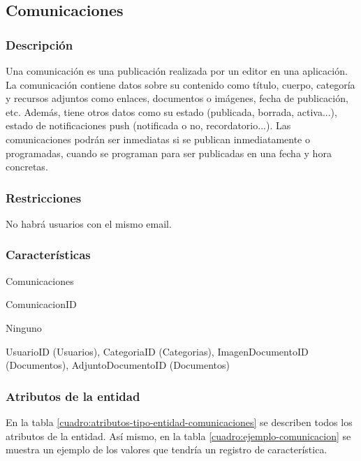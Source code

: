 \subsection{Comunicaciones}

\subsubsection*{Descripción}
Una comunicación es una publicación realizada por un editor en una aplicación. La comunicación contiene datos sobre su contenido como título, cuerpo, categoría y recursos adjuntos como enlaces, documentos o imágenes, fecha de publicación, etc. Además, tiene otros datos como su estado (publicada, borrada, activa...), estado de notificaciones push (notificada o no, recordatorio...). Las comunicaciones podrán ser inmediatas si se publican inmediatamente o programadas, cuando se programan para ser publicadas en una fecha y hora concretas.

\subsubsection*{Restricciones}
No habrá usuarios con el mismo email.

\subsubsection*{Características}
\begin{description}[nosep,style=multiline,labelindent=0.8cm,leftmargin=4.5cm,font=\normalfont]
    \item[Nombre] Comunicaciones
    \item[Id. principal] ComunicacionID
    \item[Id. alternativo] Ninguno
    \item[Atrib. heredados] UsuarioID (Usuarios), CategoriaID (Categorias), ImagenDocu\linebreak mentoID (Documentos), AdjuntoDocumentoID (Documentos)
\end{description}

\subsubsection*{Atributos de la entidad}
En la tabla \ref{cuadro:atributos-tipo-entidad-comunicaciones} se describen todos los atributos de la entidad. Así mismo, en la tabla \ref{cuadro:ejemplo-comunicacion} se muestra un ejemplo de los valores que tendría un registro de característica.

